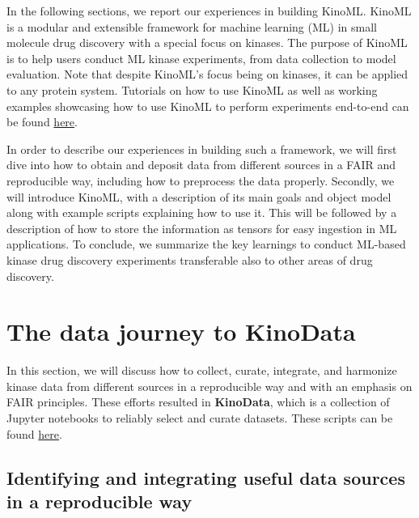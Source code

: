 \documentclass[9pt,lessons]{livecoms}
\begin{document}
In the following sections, we report our experiences in building KinoML. KinoML is a modular and extensible framework for machine learning (ML) in small molecule drug discovery with a special focus on kinases. The purpose of KinoML is to help users conduct ML kinase experiments, from data collection to model evaluation. Note that despite KinoML's focus being on kinases, it can be applied to any protein system. Tutorials on how to use KinoML as well as working examples showcasing how to use KinoML to perform experiments end-to-end can be found \hyperlink{https://github.com/openkinome/kinoml/tree/master/tutorials}{here}. 


In order to describe our experiences in building such a framework, we will first dive into how to obtain and deposit data from different sources in a FAIR and reproducible way, including how to preprocess the data properly. 
Secondly, we will introduce KinoML, with a description of its main goals and object model along with example scripts explaining how to use it. 
This will be followed by a description of how to store the information as tensors for easy ingestion in ML applications. 
To conclude, we summarize the key learnings to conduct ML-based kinase drug discovery experiments transferable also to other areas of drug discovery.

\section{The data journey to KinoData}
In this section, we will discuss how to collect, curate, integrate, and harmonize kinase data from different sources in a reproducible way and with an emphasis on FAIR principles. These efforts resulted in \textbf{KinoData}, which is a collection of Jupyter notebooks to reliably select and curate datasets. These scripts can be found \hyperlink{https://github.com/openkinome/kinodata}{here}.

\subsection{Identifying and integrating useful data sources in a reproducible way}
\end{document}
